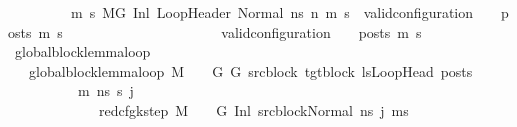 \begin{isabellebody}
\ \ \ \ \ \ \ \ \ {\isacharparenleft}{\kern0pt}{\isasymforall}m{}{\isacharprime}{\kern0pt}\ s{}{\isacharprime}{\kern0pt}{\isachardot}{\kern0pt}{\isacharparenleft}{\kern0pt}\ M{\isacharcomma}{\kern0pt}{\isasymLambda}{\isacharcomma}{\kern0pt}{\isasymGamma}{\isacharcomma}{\kern0pt}{\isasymOmega}{\isacharcomma}{\kern0pt}G{\isacharprime}{\kern0pt}\ {\isasymturnstile}{\isacharparenleft}{\kern0pt}Inl\ LoopHeader{\isacharprime}{\kern0pt}{\isacharcomma}{\kern0pt}\ Normal\ ns{}{\isacharprime}{\kern0pt}{\isacharparenright}{\kern0pt}\ {\isacharminus}{\kern0pt}n{\isasymrightarrow}{\isacharasterisk}{\kern0pt}\ {\isacharparenleft}{\kern0pt}m{}{\isacharprime}{\kern0pt}{\isacharcomma}{\kern0pt}\ s{}{\isacharprime}{\kern0pt}{\isacharparenright}{\kern0pt}{\isacharparenright}{\kern0pt}\ {\isasymlongrightarrow}\ valid{\isacharunderscore}{\kern0pt}configuration\ {\isasymLambda}\ {\isasymGamma}\ {\isasymOmega}\ posts\ m{}{\isacharprime}{\kern0pt}\ s{}{\isacharprime}{\kern0pt}{\isacharparenright}{\kern0pt}\ {\isasymlongrightarrow}\isanewline
\ \ \ \ \ \ \ \ \ \ \ \ \ \ \ \ \ \ \ \ \ valid{\isacharunderscore}{\kern0pt}configuration\ {\isasymLambda}\ {\isasymGamma}\ {\isasymOmega}\ posts\ m{\isacharprime}{\kern0pt}\ s{\isacharprime}{\kern0pt}{\isacharparenright}{\kern0pt}{\isachardoublequoteclose}\isanewline
\isanewline
{}\isamarkupfalse%
\ global{\isacharunderscore}{\kern0pt}block{\isacharunderscore}{\kern0pt}lemma{\isacharunderscore}{\kern0pt}loop\isanewline
\ \ \ {\isachardoublequoteopen}global{\isacharunderscore}{\kern0pt}block{\isacharunderscore}{\kern0pt}lemma{\isacharunderscore}{\kern0pt}loop\ M\ {\isasymLambda}\ {\isasymGamma}\ {\isasymOmega}\ G\ G{\isacharprime}{\kern0pt}\ src{\isacharunderscore}{\kern0pt}block\ tgt{\isacharunderscore}{\kern0pt}block\ lsLoopHead\ posts\ {\isasymequiv}\ \isanewline
\ \ \ \ \ \ \ \ \ \ {\isasymforall}m{\isacharprime}{\kern0pt}\ ns\ s{\isacharprime}{\kern0pt}\ j{\isachardot}{\kern0pt}\ \ \isanewline
\ \ \ \ \ \ \ \ \ \ \ \ \ {\isacharparenleft}{\kern0pt}red{\isacharunderscore}{\kern0pt}cfg{\isacharunderscore}{\kern0pt}k{\isacharunderscore}{\kern0pt}step\ M\ {\isasymLambda}\ {\isasymGamma}\ {\isasymOmega}\ G\ {\isacharparenleft}{\kern0pt}{\isacharparenleft}{\kern0pt}Inl\ src{\isacharunderscore}{\kern0pt}block{\isacharparenright}{\kern0pt}{\isacharcomma}{\kern0pt}{\isacharparenleft}{\kern0pt}Normal\ ns{\isacharparenright}{\kern0pt}{\isacharparenright}{\kern0pt}\ j\ {\isacharparenleft}{\kern0pt}m{\isacharprime}{\kern0pt}{\isacharcomma}{\kern0pt}s{\isacharprime}{\kern0pt}{\isacharparenright}{\kern0pt}{\isacharparenright}{\kern0pt}\ {\isasymlongrightarrow}\isanewline

\end{isabellebody}
